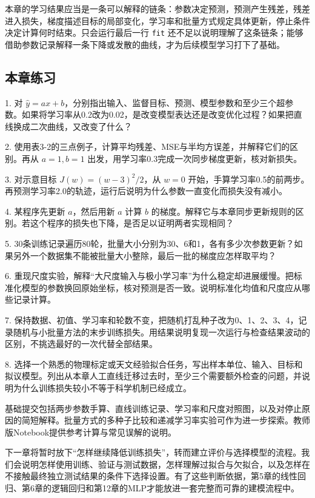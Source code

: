 本章的学习结果应当是一条可以解释的链条：参数决定预测，预测产生残差，残差进入损失，梯度描述目标的局部变化，学习率和批量方式规定具体更新，停止条件决定计算何时结束。只会运行最后一行 \texttt{fit} 还不足以说明理解了这条链条；能够借助参数记录解释一条下降或发散的曲线，才为后续模型学习打下了基础。

\subsection{本章练习}

1. 对 \(\widehat{y} = ax + b\)，分别指出输入、监督目标、预测、模型参数和至少三个超参数。如果将学习率从0.2改为0.02，是改变模型表达还是改变优化过程？如果把直线换成二次曲线，又改变了什么？

2. 使用表3-2的三点例子，计算平均残差、MSE与半均方误差，并解释它们的区别。再从 \(a = 1,b = 1\) 出发，用学习率0.3完成一次同步梯度更新，核对新损失。

3. 对示意目标 \(J(w) = (w - 3)^{2}/2\)，从 \(w = 0\) 开始，手算学习率0.5的前两步。再预测学习率2.0的轨迹，运行后说明为什么参数一直变化而损失没有减小。

4. 某程序先更新 \(a\)，然后用新 \(a\) 计算 \(b\) 的梯度。解释它与本章同步更新规则的区别。若这个程序的损失也下降，是否足以证明两者实现相同？

5. 30条训练记录遍历80轮，批量大小分别为30、6和1，各有多少次参数更新？如果另外一个数据集不能被批量大小整除，最后一批的梯度应怎样取平均？

6. 重现尺度实验，解释``大尺度输入与极小学习率''为什么稳定却进展缓慢。把标准化模型的参数换回原始坐标，核对预测是否一致。说明标准化均值和尺度应从哪些记录计算。

7. 保持数据、初值、学习率和轮数不变，把随机打乱种子改为0、1、2、3、4，记录随机与小批量方法的末步训练损失。用结果说明复现一次运行与检查结果波动的区别，不挑选最好的一次代替全部结果。

8. 选择一个熟悉的物理标定或天文经验拟合任务，写出样本单位、输入、目标和拟议模型。列出从本章人工直线迁移过去时，至少三个需要额外检查的问题，并说明为什么训练损失较小不等于科学机制已经成立。

基础提交包括两步参数手算、直线训练记录、学习率和尺度对照图，以及对停止原因的简短解释。批量方式的多种子比较和递减学习率实验可作为进一步探索。教师版Notebook提供参考计算与常见误解的说明。

下一章将暂时放下``怎样继续降低训练损失''，转而建立评价与选择模型的流程。我们会说明怎样使用训练、验证与测试数据，怎样理解过拟合与欠拟合，以及怎样在不接触最终独立测试结果的条件下选择设置。有了这些判断依据，第5章的线性回归、第6章的逻辑回归和第12章的MLP才能放进一套完整而可靠的建模流程中。

